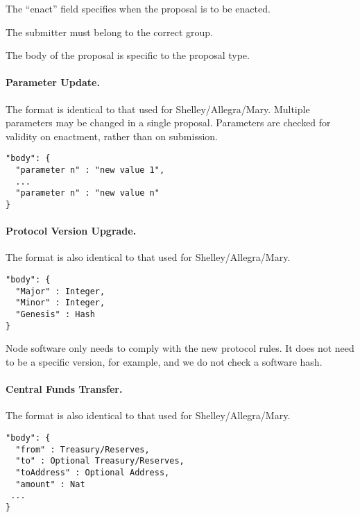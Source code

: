 The ``enact'' field specifies when the proposal is to be enacted.

The submitter must belong to the correct group.  

The body of the proposal is specific to the proposal type.


\paragraph{Parameter Update.}  The format is identical to that used for Shelley/Allegra/Mary.  Multiple parameters may be changed in a single proposal.
Parameters are checked for validity on enactment, rather than on submission.


\begin{verbatim}
"body": {
  "parameter n" : "new value 1",
  ...
  "parameter n" : "new value n"
}
\end{verbatim}

\paragraph{Protocol Version Upgrade.}  The format is also identical to that used for Shelley/Allegra/Mary.


\begin{verbatim}
"body": {
  "Major" : Integer,
  "Minor" : Integer,
  "Genesis" : Hash
}
\end{verbatim}

Node software only needs to comply with the new protocol rules.  It does not need to be a specific version, for example, and we do not check a software hash.



\paragraph{Central Funds Transfer.}  The format is also identical to that used for Shelley/Allegra/Mary.


\begin{verbatim}
"body": {
  "from" : Treasury/Reserves,
  "to" : Optional Treasury/Reserves,
  "toAddress" : Optional Address,
  "amount" : Nat
 ...
}
\end{verbatim}

